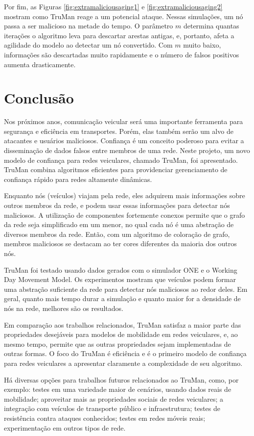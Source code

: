 \begin{resumoextendido}
	Por fim, as Figuras \ref{fig:extramaliciousaging1} e \ref{fig:extramaliciousaging2} mostram como TruMan reage a um potencial ataque.
	Nessas simulações, um nó passa a ser malicioso na metade do tempo.
	O parâmetro $m$ determina quantas iterações o algoritmo leva para descartar arestas antigas, e, portanto, afeta a agilidade do modelo ao detectar um nó convertido.
	Com $m$ muito baixo, informações são descartadas muito rapidamente e o número de falsos positivos aumenta drasticamente.
	
	\section*{Conclusão}
	
	Nos próximos anos, comunicação veicular será uma importante ferramenta para segurança e eficiência em transportes.
	Porém, elas também serão um alvo de atacantes e usuários maliciosos.
	Confiança é um conceito poderoso para evitar a disseminação de dados falsos entre membros de uma rede.
	Neste projeto, um novo modelo de confiança para redes veiculares, chamado TruMan, foi apresentado.
	TruMan combina algoritmos eficientes para providenciar gerenciamento de confiança rápido para redes altamente dinâmicas.
	
	Enquanto nós (veículos) viajam pela rede, eles adquirem mais informações sobre outros membros da rede, e podem usar essas informações para detectar nós maliciosos.
	A utilização de componentes fortemente conexos permite que o grafo da rede seja simplificado em um menor, no qual cada nó é uma abstração de diversos membros da rede.
	Então, com um algoritmo de coloração de grafo, membros maliciosos se destacam ao ter cores diferentes da maioria dos outros nós.
	
	TruMan foi testado usando dados gerados com o simulador ONE e o Working Day Movement Model.
	Os experimentos mostram que veículos podem formar uma abstração suficiente da rede para detectar nós maliciosos ao redor deles.
	Em geral, quanto mais tempo durar a simulação e quanto maior for a densidade de nós na rede, melhores são os resultados.
	
	Em comparação aos trabalhos relacionados, TruMan satisfaz a maior parte das propriedades desejáveis para modelos de mobilidade em redes veiculares, e, ao mesmo tempo, permite que as outras propriedades sejam implementadas de outras formas.
	O foco do TruMan é eficiência e é o primeiro modelo de confiança para redes veiculares a apresentar claramente a complexidade de seu algoritmo.
	
	Há diversas opções para trabalhos futuros relacionados ao TruMan, como, por exemplo:
	testes em uma variedade maior de cenários, usando dados reais de mobilidade;
	aproveitar mais as propriedades sociais de redes veiculares;
	a integração com veículos de transporte público e infraestrutura;
	testes de resistência contra ataques conhecidos;
	testes em redes móveis reais;
	experimentação em outros tipos de rede.
	
	
\end{resumoextendido}